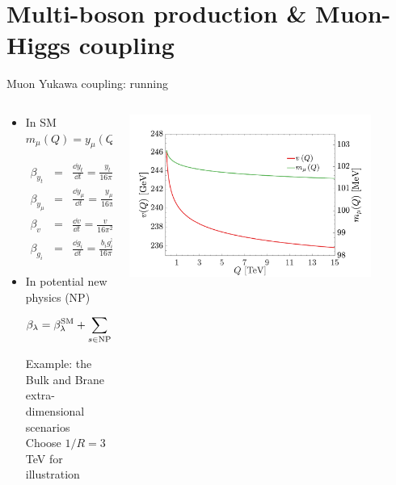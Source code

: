 \documentclass[aspectratio=169]{beamer}
\begin{document}
\section{Multi-boson production \& Muon-Higgs coupling}
\begin{frame}{Muon Yukawa coupling: running}
	\begin{columns}
		\begin{column}{0.65\textwidth}
			\begin{itemize}
			\item In SM $m_\mu(Q)=y_\mu(Q)v(Q)/\sqrt{2}$
				\begin{tiny}
					\begin{eqnarray}
						\beta_{y_t}&=& \frac{\dd y_t}{\dd t} = \frac{y_t}{16 \pi^2} \left (\frac{9}{2}y_t^2 - 8 g_3^2 - \frac{9}{4} g_2^2 - \frac{17}{20} g_1^2 \right), \nonumber\\
						\beta_{y_\mu}&=& \frac{\dd y_\mu}{\dd t} = \frac{y_\mu}{16 \pi^2} \left (3y_t^2 - \frac{9}{4}(g_2^2 + g_1^2) \right), \nonumber\\
						\beta_{v}&=& \frac{\dd v}{\dd t} = \frac{v}{16 \pi^2} \left(\frac{9}{4} g_2^2+\frac{9}{20} g_1^2-3 y_t^2 \right), \nonumber \\
						\beta_{g_i} &=& \frac{\dd g_i}{\dd t} = \frac{b_i g_i^3}{16 \pi^2},\nonumber
					\end{eqnarray}
				\end{tiny}
				\item In potential new physics (NP)
				\begin{small}
					\begin{equation*}
					\beta_{\lambda}=\beta_{\lambda}^{\mathrm{SM}}+\sum_{s\in{\rm NP}} \Theta\left(Q-M_{s}\right) \times N_{s} \beta_{s, \lambda}^{\mathrm{NP}}
					\end{equation*}
				\end{small}
				{\small Example: the Bulk and Brane extra-dimensional scenarios} \\{\tiny Choose $1/R=3$ TeV for illustration} 
			\end{itemize}
		\end{column}
		\vspace{-4mm}
		\begin{column}{0.48\textwidth}
			\includegraphics[width=0.85\textwidth]{figs/YukawaRunning/Mmu_vevSM2}

\end{column}
\end{columns}
\end{frame}
\end{document}
